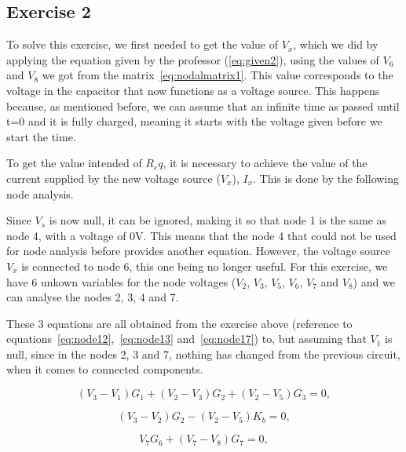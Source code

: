 \subsection{Exercise 2}
\label{sec:exercise2}

To solve this exercise, we first needed to get the value of $V_x$, which we did by applying the equation given by the professor (\ref{eq:given2}), using the values of $V_6$ and $V_8$ we got from the matrix~\ref{eq:nodalmatrix1}. This value corresponds to the voltage in the capacitor that now functions as a voltage source. This happens because, as mentioned before, we can assume that an infinite time as passed until t=0 and it is fully charged, meaning it starts with the voltage given before we start the time.

To get the value intended of $R_eq$, it is necessary to achieve the value of the current supplied by the new voltage source ($V_x$), $I_x$. This is done by the following node analysis.

Since $V_s$ is now null, it can be ignored, making it so that node 1 is the same as node 4, with a voltage of 0V. This means that the node 4 that could not be used for node analysis before provides another equation. However, the voltage source $V_x$ is connected to node 6, this one being no longer useful. For this exercise, we have 6 unkown variables for the node voltages ($V_2$, $V_3$, $V_5$, $V_6$, $V_7$ and $V_8$) and we can analyse the nodes 2, 3, 4 and 7.

These 3 equations are all obtained from the exercise above (reference to equations~\ref{eq:node12},~\ref{eq:node13} and~\ref{eq:node17}) to, but assuming that $V_1$ is null, since in the nodes 2, 3 and 7, nothing has changed from the previous circuit, when it comes to connected components.

\begin{equation}
  (V_{3} - V_{1})G_{1} + (V_{2} - V_{3})G_{2} + (V_{2} - V_{5})G_{3}= 0,
  \label{eq:node22}
\end{equation}

\begin{equation}
  (V_{3} - V_{2})G_{2} - (V_{2} - V_{5})K_{b} = 0,
  \label{eq:node23}
\end{equation}

\begin{equation}
  V_{7}G_{6} + (V_{7} - V_{8})G_{7} = 0,
  \label{eq:node27}
\end{equation}

